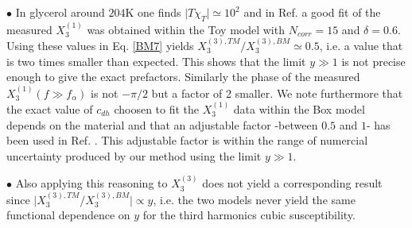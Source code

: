 \documentclass[single column,pre]{revtex4}
\begin{document}
$\bullet$ In glycerol around $204$K one finds $\vert T \chi_T \vert \simeq 10^2$ and in Ref. \cite{Lad12} a good fit of the measured $X_3^{(1)}$ was obtained within the Toy model with $N_{corr} = 15$ and $\delta = 0.6$. Using these values in Eq. \ref{BM7} yields $X_3^{(3),TM}/X_3^{(3),BM} \simeq 0.5$, i.e. a value that is two times smaller than expected. This shows that the limit $y \gg 1$ is not precise enough to give the exact prefactors. Similarly the phase of the measured $X_{3}^{(1)}(f \gg f_{\alpha})$ is not $- \pi/2$ but a factor of 2 smaller. We note furthermore that the exact value of $c_{dh}$ choosen to fit the $X_{3}^{(1)}$ data within the Box model depends on the material and that an adjustable factor -between $0.5$ and $1$- has been used in Ref. \cite{Wan07}. This adjustable factor is within the range of numercial uncertainty produced by our method using the limit $y \gg 1$.

$\bullet$ Also applying this reasoning to $X_3^{(3)}$ does not yield a corresponding result since 
$\vert X_3^{(3),TM}/X_3^{(3),BM}\vert \propto y$, i.e. the two models never yield the same functional dependence on $y$ for the third harmonics cubic susceptibility.  
\end{document}
